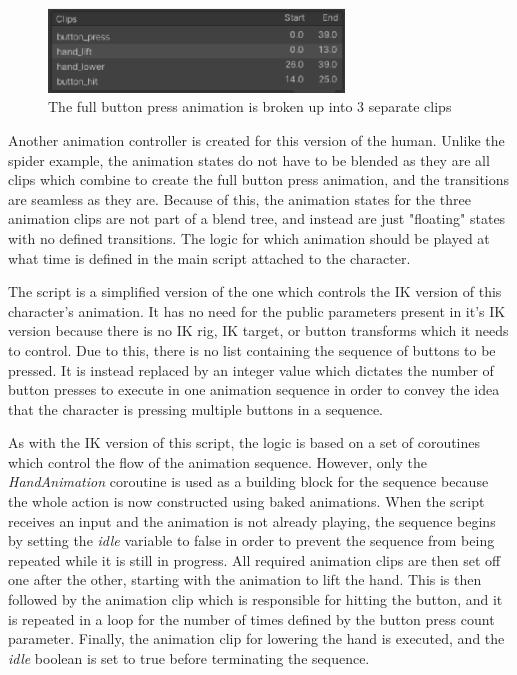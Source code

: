 \begin{figure}[h!]
    \centering
    \captionsetup{justification=centering}
    \includegraphics[width=0.7\textwidth]{grafika/bp_clips.eps}
    \caption{The full button press animation is broken up into 3 separate clips}
    \label{fig:bp_clips}
\end{figure}

Another animation controller is created for this version of the human. Unlike
the spider example, the animation states do not have to be blended as they are
all clips which combine to create the full button press animation, and the
transitions are seamless as they are. Because of this, the animation states for
the three animation clips are not part of a blend tree, and instead are just
"floating" states with no defined transitions. The logic for which animation
should be played at what time is defined in the main script attached to the
character. 

The script is a simplified version of the one which controls the IK version of
this character's animation. It has no need for the public parameters present in
it's IK version because there is no IK rig, IK target, or button transforms
which it needs to control. Due to this, there is no list containing the sequence
of buttons to be pressed. It is instead replaced by an integer value which
dictates the number of button presses to execute in one animation sequence in
order to convey the idea that the character is pressing multiple buttons in
a sequence. 

As with the IK version of this script, the logic is based on a set of coroutines
which control the flow of the animation sequence. However, only the
\textit{HandAnimation} coroutine is used as a building block for the sequence
because the whole action is now constructed using baked animations. When the
script receives an input and the animation is not already playing, the sequence
begins by setting the \textit{idle} variable to false in order to prevent the sequence
from being repeated while it is still in progress. All required animation clips
are then set off one after the other, starting with the animation to lift the
hand. This is then followed by the animation clip which is responsible for
hitting the button, and it is repeated in a loop for the number of times defined
by the button press count parameter. Finally, the animation clip for lowering
the hand is executed, and the \textit{idle} boolean is set to true before
terminating the sequence.

